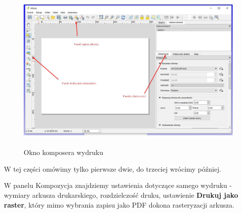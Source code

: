 \documentclass[12pt,a4paper]{book}
\begin{document}
\begin{center}
\begin{figure}
\includegraphics[width=13cm,height=8.139cm]{008-kompozer.jpg}
\caption{Okno komposera wydruku}
\end{figure}
\end{center}
W tej części omówimy tylko pierwsze dwie, do trzeciej wrócimy później.

W panelu  Kompozycja  znajdziemy ustawienia dotyczące samego wydruku - wymiary arkusza drukarskiego, rozdzielczość druku, ustawienie \textbf{Drukuj jako raster}, który mimo \textbf{ }wybrania zapisu jako PDF dokona rasteryzacji arkusza.
\end{document}
